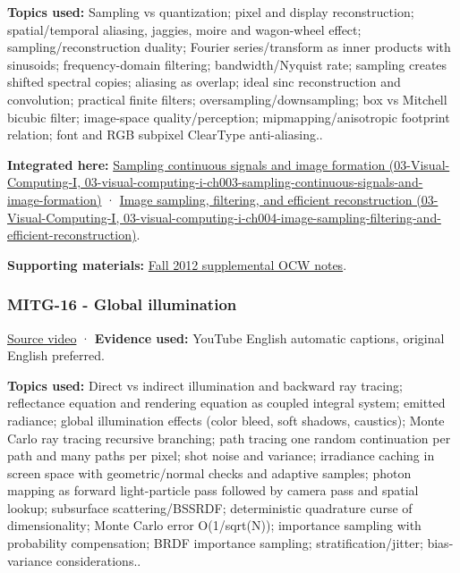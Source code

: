 \textbf{Topics used:} Sampling vs quantization; pixel and display reconstruction; spatial/temporal aliasing, jaggies, moire and wagon-wheel effect; sampling/reconstruction duality; Fourier series/transform as inner products with sinusoids; frequency-domain filtering; bandwidth/Nyquist rate; sampling creates shifted spectral copies; aliasing as overlap; ideal sinc reconstruction and convolution; practical finite filters; oversampling/downsampling; box vs Mitchell bicubic filter; image-space quality/perception; mipmapping/anisotropic footprint relation; font and RGB subpixel ClearType anti-aliasing..

\textbf{Integrated here:} \href{../03-Visual-Computing-I/main.pdf\#nameddest=03-visual-computing-i-ch003-sampling-continuous-signals-and-image-formation}{Sampling continuous signals and image formation (03-Visual-Computing-I, 03-visual-computing-i-ch003-sampling-continuous-signals-and-image-formation)} · \href{../03-Visual-Computing-I/main.pdf\#nameddest=03-visual-computing-i-ch004-image-sampling-filtering-and-efficient-reconstruction}{Image sampling, filtering, and efficient reconstruction (03-Visual-Computing-I, 03-visual-computing-i-ch004-image-sampling-filtering-and-efficient-reconstruction)}.

\textbf{Supporting materials:} \href{https://ocw.mit.edu/courses/6-837-computer-graphics-fall-2012/pages/lecture-notes/}{Fall 2012 supplemental OCW notes}.

\subsubsection{MITG-16 - Global illumination}\label{04-visual-computing-ii-ch036-mitg-16---global-illumination}

\href{https://www.youtube.com/watch?v=xjBwPxU7tUk}{Source video} · \textbf{Evidence used:} YouTube English automatic captions, original English preferred.

\textbf{Topics used:} Direct vs indirect illumination and backward ray tracing; reflectance equation and rendering equation as coupled integral system; emitted radiance; global illumination effects (color bleed, soft shadows, caustics); Monte Carlo ray tracing recursive branching; path tracing one random continuation per path and many paths per pixel; shot noise and variance; irradiance caching in screen space with geometric/normal checks and adaptive samples; photon mapping as forward light-particle pass followed by camera pass and spatial lookup; subsurface scattering/BSSRDF; deterministic quadrature curse of dimensionality; Monte Carlo error O(1/sqrt(N)); importance sampling with probability compensation; BRDF importance sampling; stratification/jitter; bias-variance considerations..


